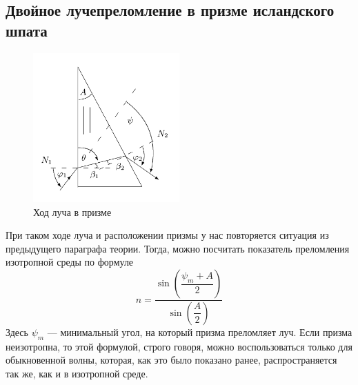 \documentclass[a4paper, 12pt]{article}
\begin{document}
\subsection*{Двойное лучепреломление в призме исландского шпата}
\begin{figure}
	\begin{center}
		\includegraphics[width = 0.5\textwidth]{prism.png}
		  \end{center}
	  \caption{Ход луча в призме}
\end{figure}
При таком ходе луча и расположении призмы у нас повторяется ситуация из предыдущего параграфа теории. Тогда, можно посчитать показатель преломления изотропной среды по формуле 
\begin{equation}
n = \dfrac{\sin\left(\dfrac{\psi_m + A}{2}\right)}{\sin \left(\dfrac{A}{2}\right)}
\end{equation}
Здесь $\psi_m$  --- минимальный угол, на который призма преломляет луч.
Если призма неизотропна, то этой формулой, строго говоря, можно воспользоваться только для обыкновенной волны, которая, как это было показано ранее, распространяется так же, как и в изотропной среде. 
\end{document}
